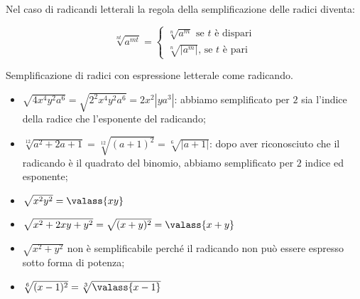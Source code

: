 Nel caso di radicandi letterali la regola della semplificazione delle radici 
diventa:

\begin{proposizione}
 \[\sqrt[nt]{a^{mt}}=\left\{\begin{array}{l}
   \sqrt[n]{a^m} \text{ se }t \text{ è dispari}\\
   \sqrt[n]{\left|a^m\right|}\text{, se }t\text{ è pari}
 \end{array}\right.\]
\end{proposizione}

 \begin{esempio}
Semplificazione di radici con espressione letterale come radicando.
\begin{itemize}
\item $\sqrt{4x^4y^2a^6}=\sqrt{2^2x^4y^2a^6}=2x^2\left|ya^3\right|$: 
 abbiamo semplificato per $2$ sia l'indice della radice che l'esponente del 
 radicando;
\item $\sqrt[12]{a^2+2a+1}=\sqrt[12]{(a+1)^2}=\sqrt[6]{\left|a+1\right|}$: 
 dopo aver riconosciuto che il radicando è il quadrato del binomio, 
 abbiamo semplificato per $2$ indice ed esponente;
\item $\sqrt{x^2y^2}=\valass{xy}$
\item $\sqrt{x^2+2xy+y^2}=\sqrt{(x+y)^2}=\valass{x+y}$
\item $\sqrt{x^2+y^2}$ non è semplificabile perché il radicando non può essere 
 espresso sotto forma di potenza;
\item $\sqrt[6]{(x-1)^2}=\sqrt[3]{\valass{x-1}}$
\end{itemize}
 \end{esempio}

% 
% 
% 

